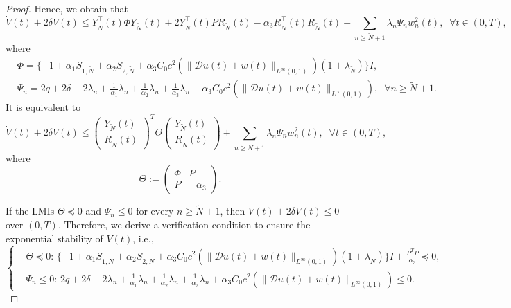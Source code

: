 \documentclass[review]{elsarticle}
\numberwithin{equation}{section}
\begin{document}
\begin{proof}
Hence, we obtain that
\begin{equation*}
    \dot{V}(t)+2\delta V(t)\le Y_{\tilde{N}}^{\top}(t)\Phi Y_{\tilde{N}}(t)+2 Y_{\tilde{N}}^{\top}(t)P R_{\tilde{N}}(t)-\alpha_3R_{\tilde{N}}^{\top}(t)R_{\tilde{N}}(t)+\sum_{n\ge \tilde{N}+1}\lambda_{n} \Psi_n w_{n}^2(t),\;\;\forall t\in (0,T),
\end{equation*}
where 
\begin{equation*}
    \begin{aligned}
    &\Phi=\{-1+ \alpha_1S_{1,\tilde{N}}+\alpha_2S_{2,\tilde{N}}+\alpha_3C_0 c^2(\|\mathcal{D}u(t)+w(t)\|_{L^{\infty}(0,1)})(1+\lambda_{\tilde{N}})\} I ,\\[2mm]
&\Psi_n=2q+2\delta-2\lambda_n+\frac{1}{\alpha_1}\lambda_n+\frac{1}{\alpha_2}\lambda_n+\frac{1}{\alpha_3}\lambda_n+\alpha_3C_0 c^2(\|\mathcal{D}u(t)+w(t)\|_{L^{\infty}(0,1)}),\;\;\forall n\ge \tilde{N}+1.
    \end{aligned}
\end{equation*}
It is equivalent to
\begin{equation*}
    \label{LMIs}
    \dot{V}(t)+2\delta V(t)\le \begin{pmatrix}
 Y_{\tilde{N}}(t)\\
R_{\tilde{N}}(t)
\end{pmatrix}^T\Theta\begin{pmatrix}
 Y_{\tilde{N}}(t)\\
R_{\tilde{N}}(t)
\end{pmatrix}+\sum_{n\ge \tilde{N}+1}\lambda_{n} \Psi_n w_{n}^2(t),\;\;\forall t\in (0,T),
\end{equation*}
where 
\begin{equation*}
    \label{Theta}
    \Theta:=\begin{pmatrix}
 \Phi &  P\\
 P  & -\alpha_3
\end{pmatrix}.
\end{equation*}

If the LMIs $\Theta\preceq 0$ and $\Psi_n\le 0 \text{ for every }n\ge \tilde{N}+1$, then $\dot{V}(t)+2\delta V(t)\le 0$ over $(0,T)$. Therefore, we derive a verification condition to ensure the exponential stability of $V(t)$, i.e.,
\begin{equation}
\label{theta and psi<0}
\left\{\begin{aligned}
    &\Theta\preceq 0 \text{:  }\{-1+ \alpha_1S_{1,\tilde{N}}+\alpha_2S_{2,\tilde{N}}+\alpha_3C_0 c^2(\|\mathcal{D}u(t)+w(t)\|_{L^{\infty}(0,1)})(1+\lambda_{\tilde{N}})\} I +\frac{P^TP}{\alpha_3}\preceq 0,\\[2mm]
   & \Psi_n\le 0 \text{:  }  2q+2\delta-2\lambda_n+\frac{1}{\alpha_1}\lambda_n+\frac{1}{\alpha_2}\lambda_n+\frac{1}{\alpha_3}\lambda_n+\alpha_3C_0 c^2(\|\mathcal{D}u(t)+w(t)\|_{L^{\infty}(0,1)})\le 0.
    \end{aligned}\right.
\end{equation}


\end{proof}
\end{document}
